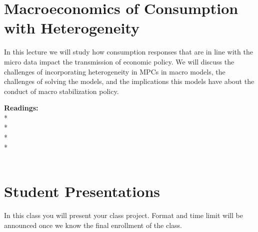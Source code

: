 \documentclass [12pt]{article}
\begin{document}
\section{Macroeconomics of Consumption with Heterogeneity}

In this lecture we will study how consumption responses that are in line with the micro data impact the transmission of economic policy. We will discuss the challenges of incorporating heterogeneity in MPCs in macro models, the challenges of solving the models, and the implications this models have about the conduct of macro stabilization policy.

\noindent\textbf{Readings:}\\
* \\
* \\
* \\
* \\
 \\



\section{Student Presentations}

In this class you will present your class project. Format and time limit will be announced once we know the final enrollment of the class.
\end{document}
